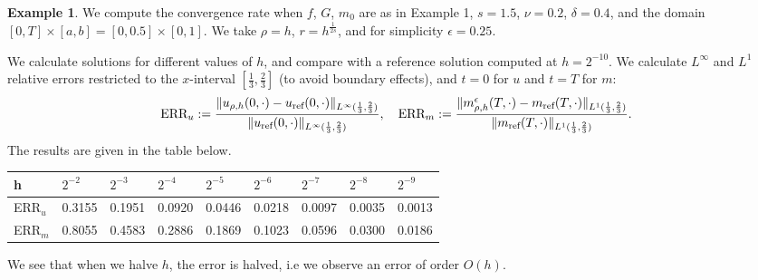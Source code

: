 \documentclass[a4paper,  twoside, 10pt, leqno]{amsart}
\theoremstyle{remark}
\theoremstyle{definition}
\newtheorem{example}{Example}
\begin{document}
\begin{example}\label{ex4}
We compute the convergence rate
when $f$, $G$, $m_{0}$ are as in Example 1, $s=1.5$, $\nu=0.2$, $\delta=0.4$, and 
the domain $ [ 0,T ] \times [ a,b ] = [ 0,0.5 ] \times [ 0,1  ]$. 
We take $\rho = h$, $r = h^{\frac{1}{2 s}}$, and for simplicity $\epsilon = 0.25$. 

We calculate solutions for different values of $h$, and compare with a reference
solution computed at $h=2^{-10}$.
We calculate $L^{\infty}$ and $L^{1}$ relative errors restricted to the $x$-interval $[ \frac{1}{3}, \frac{2}{3} ]$ (to avoid boundary effects), 
and $t=0$ for  $u$ and  $t=T$ for  $m$:
\begin{align*}
   \textup{ERR}_u:= \frac{\| u_{\rho,h} ( 0,\cdot ) - u_{\text{ref}} ( 0,\cdot ) \|_{L^{\infty} ( \frac{1}{3}, \frac{2}{3} )}}{\|  u_{\text{ref}} ( 0,\cdot ) \|_{L^{\infty} ( \frac{1}{3} , \frac{2}{3} )}}, \quad
\textup{ERR}_m:=\frac{\| m_{\rho,h}^{\epsilon} ( T,\cdot ) - m_{\text{ref}} ( T,\cdot ) \|_{L^{1} ( \frac{1}{3} , \frac{2}{3} )}}{\|  m_{\text{ref}} ( T,\cdot ) \|_{L^{1} ( \frac{1}{3} , \frac{2}{3} )}}.
\end{align*}
The results are given in the table below.
\end{example}


\begin{table}[ht!]
\begin{tabular}{l|llllllll}
    h     & $2^{-2}$ & $2^{-3}$ & $2^{-4}$ & $2^{-5}$ & $2^{-6}$ & $2^{-7}$ & $2^{-8}$ & $2^{-9}$ \\
    \hline
    ERR$_u$ & 0.3155  &  0.1951  &  0.0920  &  0.0446 &   0.0218  &  0.0097  &  0.0035 & 0.0013 \\
    ERR$_m$ & 0.8055 &   0.4583 &   0.2886  &  0.1869  &  0.1023  &  0.0596  &  0.0300 & 0.0186
\end{tabular}
\end{table}

\noindent We see that when we halve $h$, the error is halved, i.e we observe an error of order $O ( h )$.
\iffalse
\begin{figure}[ht!]
    \centering
    \begin{subfigure}[b]{0.5\textwidth}
        \texttt{[image: figures/errorplot\_u.png]}
        \caption{$L^{\infty}$-error in $u$}
        \label{fig:u_error}
    \end{subfigure}
    ~ %
    \begin{subfigure}[b]{0.5\textwidth}
        \texttt{[image: figures/errorplot\_m.png]}
        \caption{$L^{1}$-error in $m$}
        \label{fig:m_error}
    \end{subfigure}
    ~ %
    \label{fig:errors}
\end{figure}
\fi
\end{document}

